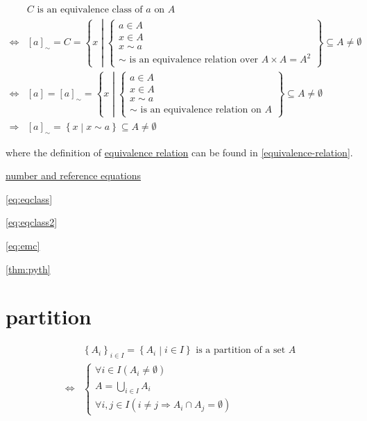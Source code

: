 \documentclass[
]{book}
\theoremstyle{definition}
\theoremstyle{definition}
\theoremstyle{definition}
\theoremstyle{definition}
\theoremstyle{remark}
\begin{document}
\begin{align*}
 & C\text{ is an equivalence class of }a\text{ on }A\\
\Leftrightarrow & \left[a\right]_{\sim}=C=\left\{ x\middle|\begin{cases}
a\in A\\
x\in A\\
x\sim a\\
\sim\text{ is an equivalence relation over }A\times A=A^{2}
\end{cases}\right\} \subseteq A\ne\emptyset\\
\Leftrightarrow & \left[a\right]=\left[a\right]_{\sim}=\left\{ x\middle|\begin{cases}
a\in A\\
x\in A\\
x\sim a\\
\sim\text{ is an equivalence relation on }A
\end{cases}\right\} \subseteq A\ne\emptyset\\
\Rightarrow & \left[a\right]_{\sim}=\left\{ x\middle|x\sim a\right\} \subseteq A\ne\emptyset
\end{align*}

where the definition of \protect\hyperlink{equivalence-relation}{equivalence relation} can be found in \ref{equivalence-relation}.

\protect\hyperlink{number-and-reference-equations}{number and reference equations}

\eqref{eq:eqclass}

\eqref{eq:eqclass2}

\eqref{eq:emc}

\ref{thm:pyth}

\hypertarget{partition}{%
\chapter*{partition}\label{partition}}

\begin{align*}
 & \left\{ A_{i}\right\} _{i\in I}=\left\{ A_{i}\middle|i\in I\right\} \text{ is a partition of a set }A\\
\Leftrightarrow & \begin{cases}
\forall i\in I\left(A_{i}\ne\emptyset\right)\\
A=\bigcup\limits _{i\in I}A_{i}\\
\forall i,j\in I\left(i\ne j\Rightarrow A_{i}\cap A_{j}=\emptyset\right)
\end{cases}
\end{align*}
\end{document}
